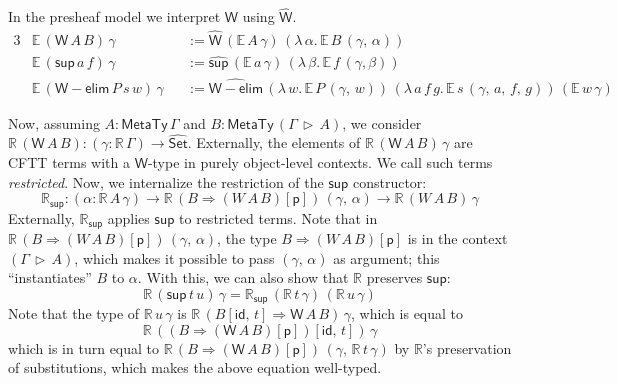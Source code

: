\documentclass[acmsmall]{acmart}
\newcommand{\mit}[1]{{\mathsf{#1}}}
\newcommand{\msf}[1]{{\mathsf{#1}}}
\newcommand{\mbb}[1]{\mathbb{#1}}
\newcommand{\p}{\mathsf{p}}
\newcommand{\wh}[1]{\widehat{#1}}
\newcommand{\whset}{\wh{\Set}}
\newcommand{\ev}{\mbb{E}}
\newcommand{\re}{\mbb{R}}
\newcommand{\vW}{\mathsf{W}}
\newcommand{\vsup}{\mathsf{sup}}
\newcommand{\whW}{\wh{\vW}}
\newcommand{\Set}{\msf{Set}}
\newcommand{\ext}{\triangleright}
\newcommand{\MTy}{\msf{MetaTy}}
\theoremstyle{remark}
\newcommand{\id}{\mit{id}}
\begin{document}
In the presheaf model we interpret $\vW$ using $\whW$.
\begin{alignat*}{3}
  & \ev\,(\vW\,A\,B)\,\gamma   &&:= \wh{\vW}\,(\ev\,A\,\gamma)\,(\lambda\,\alpha.\,\ev\,B\,(\gamma,\,\alpha))\\
  & \ev\,(\vsup\,a\,f)\,\gamma &&:= \wh{\vsup}\,(\ev\,a\,\gamma)\,(\lambda\,\beta.\,\ev\,f\,(\gamma, \beta))\\
  & \ev\,(\vW{-}\msf{elim}\,P\,s\,w)\,\gamma &&:= \wh{\vW{-}\msf{elim}}\,(\lambda\,w.\,\ev\,P\,(\gamma,\,w))\,(\lambda\,a\,f\,g.\,\ev\,s\,(\gamma,\,a,\,f,\,g))\,(\ev\,w\,\gamma)
\end{alignat*}

Now, assuming $A : \MTy\,\Gamma$ and $B : \MTy\,(\Gamma\,\ext\,A)$, we consider
$\re\,(\vW\,A\,B) : (\gamma : \re\,\Gamma) \to \whset$. Externally, the elements
of $\re\,(\vW\,A\,B)\,\gamma$ are CFTT terms with a $\vW$-type in purely
object-level contexts. We call such terms \emph{restricted}. Now, we internalize
the restriction of the $\vsup$ constructor:
\[ \re_{\vsup} : (\alpha : \re\,A\,\gamma) \to \re\,(B \Rightarrow (W\,A\,B)[\p])\,(\gamma,\,\alpha) \to \re\,(W\,A\,B)\,\gamma \]
Externally, $\re_{\vsup}$ applies $\vsup$ to restricted terms. Note that in
$\re\,(B \Rightarrow (W\,A\,B)[\p])\,(\gamma,\,\alpha)$, the type $B \Rightarrow (W\,A\,B)[\p]$ is in
the context $(\Gamma\,\ext\,A)$, which makes it possible to pass $(\gamma,\,\alpha)$ as
argument; this ``instantiates'' $B$ to $\alpha$. With this, we can also
show that $\re$ preserves $\vsup$:
\[ \re\,(\vsup\,t\,u)\,\gamma = \re_\vsup\,(\re\,t\,\gamma)\,(\re\,u\,\gamma) \]
Note that the type of $\re\,u\,\gamma$ is $\re\,(B[\id,\,t] \Rightarrow
\vW\,A\,B)\,\gamma$, which is equal to
\[\re\,((B \Rightarrow(\vW\,A\,B)[\p])[\id,\,t])\,\gamma\]
which is in turn equal to $\re\,(B \Rightarrow
(\vW\,A\,B)[\p])\,(\gamma,\,\re\,t\,\gamma)$ by $\re$'s preservation of
substitutions, which makes the above equation well-typed.
\end{document}
